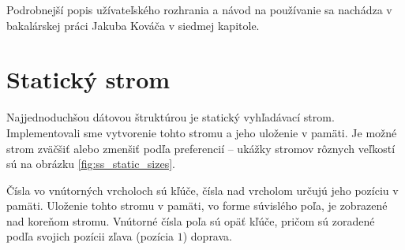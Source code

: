 Podrobnejší popis užívateľského rozhrania a návod na používanie sa nachádza v bakalárskej práci Jakuba Kováča \citep{algviskuko} v siedmej kapitole.

\section{Statický strom}
Najjednoduchšou dátovou štruktúrou je statický vyhľadávací strom. Implementovali sme vytvorenie tohto stromu a jeho uloženie v pamäti. Je možné strom zväčšiť alebo zmenšiť podľa preferencií -- ukážky stromov rôznych veľkostí sú na obrázku \ref{fig:ss_static_sizes}.

Čísla vo vnútorných vrcholoch sú kľúče, čísla nad vrcholom určujú jeho pozíciu v pamäti. Uloženie tohto stromu v pamäti, vo forme súvislého poľa, je zobrazené nad koreňom stromu. Vnútorné čísla poľa sú opäť kľúče, pričom sú zoradené podľa svojich pozícii zľava (pozícia $1$) doprava.

